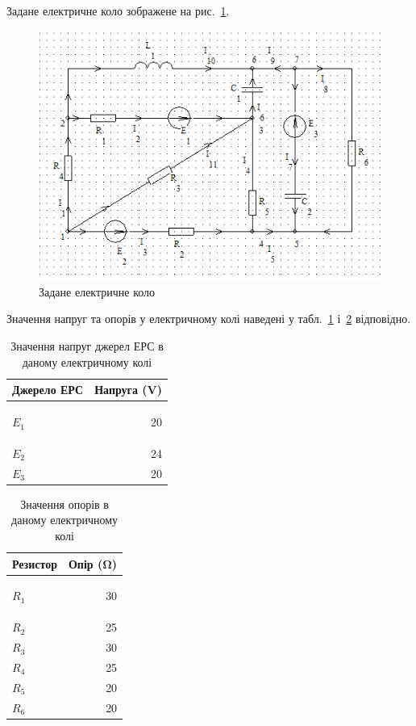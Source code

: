 \documentclass[a4paper,oneside,DIV=12,12pt]{scrartcl}
\begin{document}
		Задане електричне коло зображене на рис.~\ref{fig:01-scheme-full}.
	
		\begin{figure}[!htbp]
		\centering
			\includegraphics[height = 13\baselineskip]{assets/01-01-scheme-full.png}
		\caption{Задане електричне коло}
		\label{fig:01-scheme-full}
		\end{figure}
		
		Значення напруг та опорів у електричному колі наведені у табл.~\ref{tab:01-voltages} і~\ref{tab:01-resistances} відповідно.
		
		\begin{longtable}{lr}
			\toprule
				Джерело ЕРС & Напруга (\si{\volt})\\
			\midrule
			\endhead
			\bottomrule
			\caption{Значення напруг джерел ЕРС в даному електричному колі}
			\endfoot
			\label{tab:01-voltages}
			
			$E_1$ & 20\\
			$E_2$ & 24\\
			$E_3$ & 20\\
		\end{longtable}
		
		\begin{longtable}{lr}
			\toprule
				Резистор & Опір (\si{\ohm})\\
			\midrule
			\endhead
			\bottomrule
			\caption{Значення опорів в даному електричному колі}
			\endfoot
			\label{tab:01-resistances}
			
			$R_1$ & 30\\
			$R_2$ & 25\\
			$R_3$ & 30\\
			$R_4$ & 25\\
			$R_5$ & 20\\
			$R_6$ & 20\\
		\end{longtable}
		
\end{document}
